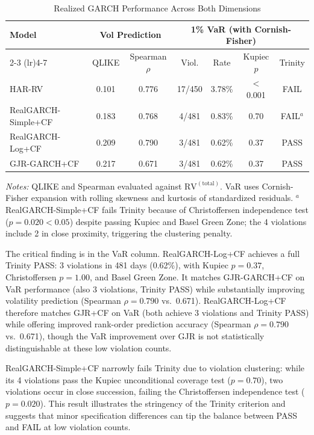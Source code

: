 \begin{table}[H]
\centering
\caption{Realized GARCH Performance Across Both Dimensions}
\label{tab:realgarch}
\begin{tabular}{lcccccc}
\toprule
Model & \multicolumn{2}{c}{Vol Prediction} & \multicolumn{4}{c}{1\% VaR (with Cornish-Fisher)} \\
\cmidrule(lr){2-3} \cmidrule(lr){4-7}
& QLIKE & Spearman $\rho$ & Viol. & Rate & Kupiec $p$ & Trinity \\
\midrule
HAR-RV         & 0.101 & 0.776 & 17/450 & 3.78\% & $<$0.001 & FAIL \\
RealGARCH-Simple+CF & 0.183 & 0.768 & 4/481  & 0.83\% & 0.70    & FAIL$^{a}$ \\
RealGARCH-Log+CF   & 0.209 & 0.790 & 3/481  & 0.62\% & 0.37    & PASS \\
GJR-GARCH+CF   & 0.217 & 0.671 & 3/481  & 0.62\% & 0.37    & PASS \\
\bottomrule
\end{tabular}
\begin{flushleft}
\small \textit{Notes:} QLIKE and Spearman evaluated against $\text{RV}^{(\text{total})}$. VaR uses Cornish-Fisher expansion with rolling skewness and kurtosis of standardized residuals. $^{a}$RealGARCH-Simple+CF fails Trinity because of Christoffersen independence test ($p = 0.020 < 0.05$) despite passing Kupiec and Basel Green Zone; the 4 violations include 2 in close proximity, triggering the clustering penalty.
\end{flushleft}
\end{table}

The critical finding is in the VaR column. RealGARCH-Log+CF achieves a full Trinity PASS: 3 violations in 481 days (0.62\%), with Kupiec $p = 0.37$, Christoffersen $p = 1.00$, and Basel Green Zone. It matches GJR-GARCH+CF on VaR performance (also 3 violations, Trinity PASS) while substantially improving volatility prediction (Spearman $\rho = 0.790$ vs.\ 0.671). RealGARCH-Log+CF therefore matches GJR+CF on VaR (both achieve 3 violations and Trinity PASS) while offering improved rank-order prediction accuracy (Spearman $\rho = 0.790$ vs.\ 0.671), though the VaR improvement over GJR is not statistically distinguishable at these low violation counts.

RealGARCH-Simple+CF narrowly fails Trinity due to violation clustering: while its 4 violations pass the Kupiec unconditional coverage test ($p = 0.70$), two violations occur in close succession, failing the Christoffersen independence test ($p = 0.020$). This result illustrates the stringency of the Trinity criterion and suggests that minor specification differences can tip the balance between PASS and FAIL at low violation counts.

